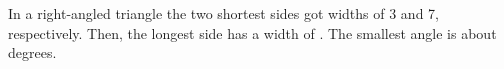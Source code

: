 \documentclass{article}
\begin{document}
\noindent
In a right-angled triangle the two shortest sides
got widths of 3 and 7, respectively. Then, the
longest side has a width of \pgfmathresult.
The smallest angle is about 
\pgfmathprintnumber[precision=2]{\pgfmathresult} degrees.
\end{document}
